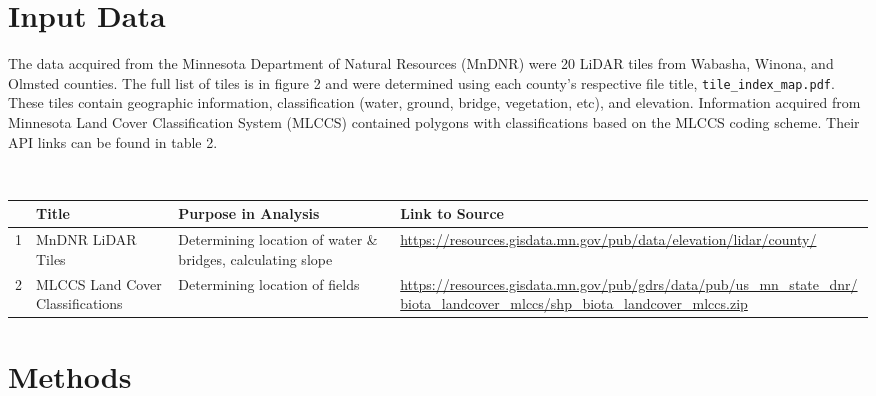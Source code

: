 \documentclass[article,12pt]{article}
\numberwithin{equation}{section}
\begin{document}
\section{Input Data}
The data acquired from the Minnesota Department of Natural Resources (MnDNR) were 20 LiDAR tiles from Wabasha, Winona, and Olmsted counties. The full list of tiles is in figure 2 and were determined using each county's respective file title, \texttt{tile\_index\_map.pdf}. These tiles contain geographic information, classification (water, ground, bridge, vegetation, etc), and elevation. Information acquired from Minnesota Land Cover Classification System (MLCCS) contained polygons with classifications based on the MLCCS coding scheme. Their API links can be found in table 2. \vspace{.5in}

\begin{adjustwidth}{-.3in}{-.3in}
\begin{multicols}{2}

\\

{
	\scriptsize
	\begin{tabular}{|l|p{.2\linewidth}|p{.2\linewidth}|p{.4\linewidth}|}
	& \textbf{Title}                              & \textbf{Purpose in Analysis}     & \textbf{Link to Source} \\ \hline
	1 & MnDNR LiDAR Tiles & Determining location of water \& bridges, calculating slope & \url{https://resources.gisdata.mn.gov/pub/data/elevation/lidar/county/}        \\                 
	2 & MLCCS Land Cover Classifications     & Determining location of fields & \url{https://resources.gisdata.mn.gov/pub/gdrs/data/pub/us_mn_state_dnr/biota_landcover_mlccs/shp_biota_landcover_mlccs.zip}                                                            
\end{tabular}
}
\end{multicols}

\section{Methods}
\end{adjustwidth}
\end{document}
